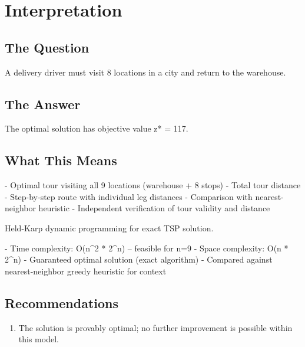 \documentclass[11pt, a4paper]{article}
\begin{document}
\section{Interpretation}

\subsection{The Question}
A delivery driver must visit 8 locations in a city and return to the warehouse.

\subsection{The Answer}

\begin{polyainsight}[title={Bottom Line}]
The optimal solution has objective value z* = 117.
\end{polyainsight}

\subsection{What This Means}

- Optimal tour visiting all 9 locations (warehouse + 8 stops)
- Total tour distance
- Step-by-step route with individual leg distances
- Comparison with nearest-neighbor heuristic
- Independent verification of tour validity and distance

Held-Karp dynamic programming for exact TSP solution.

- Time complexity: O(n\textasciicircum{}2 * 2\textasciicircum{}n) -- feasible for n=9
- Space complexity: O(n * 2\textasciicircum{}n)
- Guaranteed optimal solution (exact algorithm)
- Compared against nearest-neighbor greedy heuristic for context



\subsection{Recommendations}

\begin{enumerate}
  \item The solution is provably optimal; no further improvement is possible within this model.
\end{enumerate}
\end{document}
